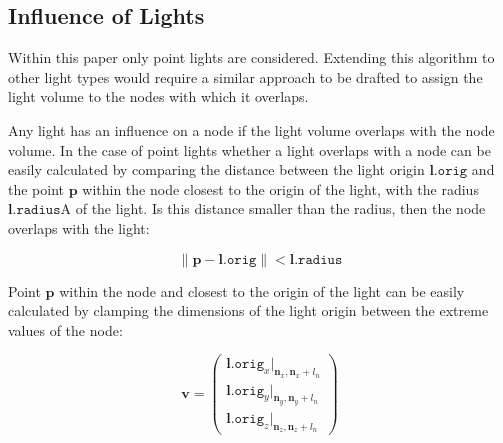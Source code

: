 

\subsection{Influence of Lights}



Within this paper only point lights are considered. Extending this algorithm to other
light types would require a similar approach to be drafted to assign the light volume
to the nodes with which it overlaps.

Any light has an influence on a node if the light volume overlaps with the node volume.
In the case of point lights whether a light overlaps with a node can be easily calculated
by comparing the distance between the light origin $\mathbf{l}\mathtt{.orig}$ and the
point $\mathbf{p}$ within the node closest to the origin of the light, with the radius
$\mathbf{l}\mathtt{.radius}$A of the light. Is this distance smaller than the radius,
then the node overlaps with the light:

\begin{equation*}
  \left\lVert \mathbf{p} - \mathbf{l}\mathtt{.orig} \right\rVert < \mathbf{l}\mathtt{.radius}
\end{equation*}

\noindent Point $\mathbf{p}$ within the node and closest to the origin of the light can be
easily calculated by clamping the dimensions of the light origin between the extreme values
of the node:

\begin{equation*}
   \mathbf{v} = \begin{pmatrix} \mathbf{l}.\mathtt{orig}_x \vert_{\mathbf{n}_{x}, \mathbf{n}_{x} + \mathit{l_n}} \\
                                \mathbf{l}.\mathtt{orig}_y \vert_{\mathbf{n}_{y}, \mathbf{n}_{y} + \mathit{l_n}} \\
                                \mathbf{l}.\mathtt{orig}_z \vert_{\mathbf{n}_{z}, \mathbf{n}_{z} + \mathit{l_n}} 
                \end{pmatrix} 
\end{equation*}

